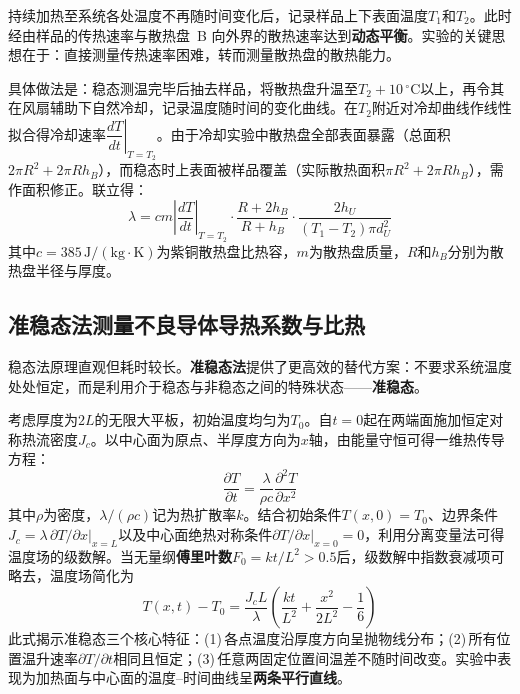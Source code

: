 \documentclass[UTF8]{article}
\begin{document}
持续加热至系统各处温度不再随时间变化后，记录样品上下表面温度$T_1$和$T_2$。此时经由样品的传热速率与散热盘~B 向外界的散热速率达到\textbf{动态平衡}。实验的关键思想在于：直接测量传热速率困难，转而测量散热盘的散热能力。

具体做法是：稳态测温完毕后抽去样品，将散热盘升温至$T_2 + 10\,^{\circ}\mathrm{C}$以上，再令其在风扇辅助下自然冷却，记录温度随时间的变化曲线。在$T_2$附近对冷却曲线作线性拟合得冷却速率$\left.\dfrac{dT}{dt}\right|_{T=T_2}$。由于冷却实验中散热盘全部表面暴露（总面积$2\pi R^2 + 2\pi R h_B$），而稳态时上表面被样品覆盖（实际散热面积$\pi R^2 + 2\pi R h_B$），需作面积修正。联立得：
\begin{equation}\label{eq:lambda-steady}
    \lambda = cm\left|\frac{dT}{dt}\right|_{T=T_2} \cdot \frac{R + 2h_B}{R + h_B} \cdot \frac{2h_U}{(T_1 - T_2)\pi d_U^2}
\end{equation}
其中$c = 385\,\mathrm{J/(kg\cdot K)}$为紫铜散热盘比热容，$m$为散热盘质量，$R$和$h_B$分别为散热盘半径与厚度。

\subsection{准稳态法测量不良导体导热系数与比热}

稳态法原理直观但耗时较长。\textbf{准稳态法}提供了更高效的替代方案：不要求系统温度处处恒定，而是利用介于稳态与非稳态之间的特殊状态——\textbf{准稳态}。

考虑厚度为$2L$的无限大平板，初始温度均匀为$T_0$。自$t=0$起在两端面施加恒定对称热流密度$J_c$。以中心面为原点、半厚度方向为$x$轴，由能量守恒可得一维热传导方程：
\begin{equation}\label{eq:heat-eq}
    \frac{\partial T}{\partial t} = \frac{\lambda}{\rho c} \frac{\partial^2 T}{\partial x^2}
\end{equation}
其中$\rho$为密度，$\lambda/(\rho c)$记为热扩散率$k$。结合初始条件$T(x,0)=T_0$、边界条件$J_c = \lambda\,\partial T/\partial x|_{x=L}$以及中心面绝热对称条件$\partial T/\partial x|_{x=0}=0$，利用分离变量法可得温度场的级数解。当无量纲\textbf{傅里叶数}$F_0 = kt/L^2 > 0.5$后，级数解中指数衰减项可略去，温度场简化为
\begin{equation}
    T(x,t) - T_0 = \frac{J_c L}{\lambda}\left(\frac{kt}{L^2} + \frac{x^2}{2L^2} - \frac{1}{6}\right)
\end{equation}
此式揭示准稳态三个核心特征：(1)\,各点温度沿厚度方向呈抛物线分布；(2)\,所有位置温升速率$\partial T/\partial t$相同且恒定；(3)\,任意两固定位置间温差不随时间改变。实验中表现为加热面与中心面的温度--时间曲线呈\textbf{两条平行直线}。
\end{document}
